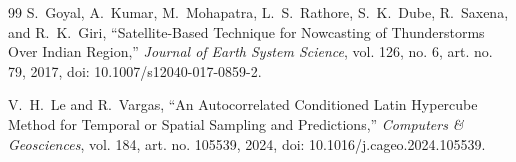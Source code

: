 \documentclass[12pt,a4paper]{report}
\begin{document}
\begin{thebibliography}{99}
S.~Goyal, A.~Kumar, M.~Mohapatra, L.~S.~Rathore, S.~K.~Dube, R.~Saxena, and R.~K.~Giri, ``Satellite-Based Technique for Nowcasting of Thunderstorms Over Indian Region,'' \emph{Journal of Earth System Science}, vol. 126, no. 6, art. no. 79, 2017, doi: 10.1007/s12040-017-0859-2.

V.~H.~Le and R.~Vargas, ``An Autocorrelated Conditioned Latin Hypercube Method for Temporal or Spatial Sampling and Predictions,'' \emph{Computers \& Geosciences}, vol. 184, art. no. 105539, 2024, doi: 10.1016/j.cageo.2024.105539.

\end{thebibliography}
\end{document}
